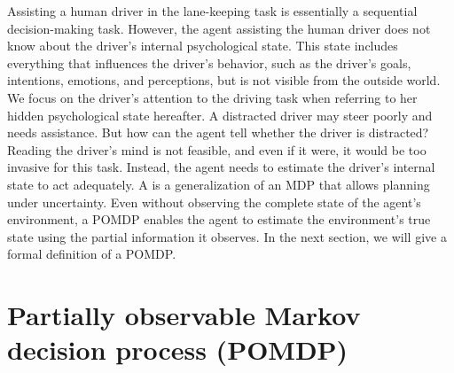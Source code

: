 \noindent
Assisting a human driver in the lane-keeping task is essentially a sequential decision-making task. However, the agent assisting the human driver does not know about the driver's internal psychological state. This state includes everything that influences the driver's behavior, such as the driver's goals, intentions, emotions, and perceptions, but is not visible from the outside world. We focus on the driver's attention to the driving task when referring to her hidden psychological state hereafter. A distracted driver may steer poorly and needs assistance. But how can the agent tell whether the driver is distracted? Reading the driver's mind is not feasible, and even if it were, it would be too invasive for this task. Instead, the agent needs to estimate the driver's internal state to act adequately. A  is a generalization of an MDP that allows planning under uncertainty. Even without observing the complete state of the agent's environment, a POMDP enables the agent to estimate the environment's true state using the partial information it observes. In the next section, we will give a formal definition of a POMDP.

\section{Partially observable Markov decision process (POMDP)}
\label{sec:pomdp}


